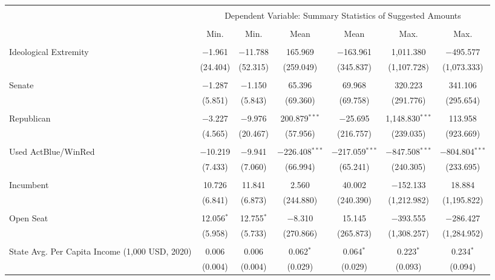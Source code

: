 
\begin{tabular}{@{\extracolsep{5pt}}lcccccc} 
\\[-1.8ex]\hline 
\hline \\[-1.8ex] 
 & \multicolumn{6}{c}{Dependent Variable: Summary Statistics of Suggested Amounts} \\ 
\cline{2-7} 
\\[-1.8ex] & Min. & Min. & Mean & Mean & Max. & Max. \\ 
\hline \\[-1.8ex] 
 Ideological Extremity & $-$1.961 & $-$11.788 & 165.969 & $-$163.961 & 1,011.380 & $-$495.577 \\ 
  & (24.404) & (52.315) & (259.049) & (345.837) & (1,107.728) & (1,073.333) \\ 
  & & & & & & \\ 
 Senate & $-$1.287 & $-$1.150 & 65.396 & 69.968 & 320.223 & 341.106 \\ 
  & (5.851) & (5.843) & (69.360) & (69.758) & (291.776) & (295.654) \\ 
  & & & & & & \\ 
 Republican & $-$3.227 & $-$9.976 & 200.879$^{***}$ & $-$25.695 & 1,148.830$^{***}$ & 113.958 \\ 
  & (4.565) & (20.467) & (57.956) & (216.757) & (239.035) & (923.669) \\ 
  & & & & & & \\ 
 Used ActBlue/WinRed & $-$10.219 & $-$9.941 & $-$226.408$^{***}$ & $-$217.059$^{***}$ & $-$847.508$^{***}$ & $-$804.804$^{***}$ \\ 
  & (7.433) & (7.060) & (66.994) & (65.241) & (240.305) & (233.695) \\ 
  & & & & & & \\ 
 Incumbent & 10.726 & 11.841 & 2.560 & 40.002 & $-$152.133 & 18.884 \\ 
  & (6.841) & (6.873) & (244.880) & (240.390) & (1,212.982) & (1,195.822) \\ 
  & & & & & & \\ 
 Open Seat & 12.056$^{*}$ & 12.755$^{*}$ & $-$8.310 & 15.145 & $-$393.555 & $-$286.427 \\ 
  & (5.958) & (5.733) & (270.866) & (265.873) & (1,308.257) & (1,284.952) \\ 
  & & & & & & \\ 
 State Avg. Per Capita Income (1,000 USD, 2020) & 0.006 & 0.006 & 0.062$^{*}$ & 0.064$^{*}$ & 0.223$^{*}$ & 0.234$^{*}$ \\ 
  & (0.004) & (0.004) & (0.029) & (0.029) & (0.093) & (0.094) \\ 

\end{tabular}
